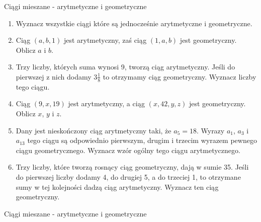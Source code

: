 \documentclass[12pt,a4paper]{article}
\begin{document}
	\begin{center}
		\LARGE Ciągi mieszane - arytmetyczne i geometryczne
	\end{center}
	\vspace{1cm}
	
	
	\begin{enumerate}[1.]	
		\item Wyznacz wszystkie ciągi które są jednocześnie arytmetyczne i geometryczne.
		
		\item Ciąg $(a,b,1)$ jest arytmetyczny, zaś ciąg $(1,a,b)$ jest geometryczny. Oblicz $a$ i $b$.
		
		\item Trzy liczby, których suma wynosi 9, tworzą ciąg arytmetyczny. Jeśli do pierwszej z nich dodamy $3\frac{1}{8}$ to otrzymamy ciąg geometryczny. Wyznacz liczby tego ciągu.
		
		\item Ciąg $(9,x,19)$ jest arytmetyczny, a ciąg $(x,42,y,z)$ jest geometryczny. Oblicz $x$, $y$ i $z$.
		
		\item Dany jest nieskończony ciąg arytmetyczny taki, że $a_5=18$. Wyrazy $a_1$, $a_3$ i $a_13$ tego ciągu są odpowiednio pierwszym, drugim i trzecim wyrazem pewnego ciągu geometrycznego. Wyznacz wzór ogólny tego ciągu arytmetycznego.
		
		\item Trzy liczby, które tworzą rosnący ciąg geometryczny, dają w sumie 35. Jeśli do pierwszej liczby dodamy 4, do drugiej 5, a do trzeciej 1, to otrzymane sumy w tej kolejności dadzą ciąg arytmetyczny. Wyznacz ten ciąg geometryczny.
		
		
	\end{enumerate}

	\begin{center}
	\LARGE Ciągi mieszane - arytmetyczne i geometryczne
\end{center}
\vspace{1cm}
\end{document}
